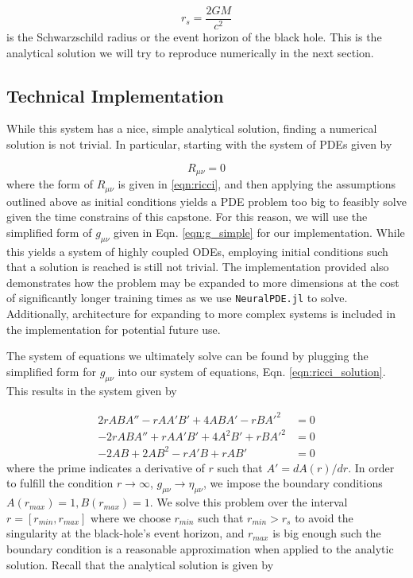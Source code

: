 \documentclass{CUP-JNL-DTM}%
\theoremstyle{definition}
\numberwithin{equation}{section}
\begin{document}
\begin{equation}
    r_s = \frac{2GM}{c^2}
\end{equation}
is the Schwarzschild radius or the event horizon of the black hole. This is the analytical solution we will try to reproduce numerically in the next section.

\subsection{Technical Implementation}

While this system has a nice, simple analytical solution, finding a numerical solution is not trivial. In particular, starting with the system of PDEs given by

\begin{equation}
    R_{\mu\nu} = 0
    \label{eqn:ricci_solution}
\end{equation}
where the form of $R_{\mu\nu}$ is given in \ref{eqn:ricci}, and then applying the assumptions outlined above as initial conditions yields a PDE problem too big to feasibly solve given the time constrains of this capstone. For this reason, we will use the simplified form of $g_{\mu\nu}$ given in Eqn. \ref{eqn:g_simple} for our implementation. While this yields a system of highly coupled ODEs, employing initial conditions such that a solution is reached is still not trivial. The implementation provided also demonstrates how the problem may be expanded to more dimensions at the cost of significantly longer training times as we use \texttt{NeuralPDE.jl} to solve. Additionally, architecture for expanding to more complex systems is included in the implementation for potential future use. 

The system of equations we ultimately solve can be found by plugging the simplified form for $g_{\mu\nu}$ into our system of equations, Eqn. \ref{eqn:ricci_solution}. This results in the system given by 

\begin{equation}
\begin{split}
    2rABA'' - rAA'B' + 4ABA' - rBA'^2 & = 0 \\
    -2rABA'' + rAA'B' + 4A^2B' + rBA'^2 & = 0 \\ 
    -2AB + 2AB^2 - rA'B + rAB' & = 0
    \label{eqn:einstein_ODEs}
\end{split}
\end{equation}
where the prime indicates a derivative of $r$ such that $A' = dA(r)/dr$. In order to fulfill the condition $r \rightarrow \infty$, $g_{\mu\nu} \rightarrow \eta_{\mu\nu}$, we impose the boundary conditions $A(r_{max}) = 1, B(r_{max}) = 1$. We solve this problem over the interval $r = [r_{min}, r_{max}]$ where we choose $r_{min}$ such that $r_{min} > r_s$ to avoid the singularity at the black-hole's event horizon, and $r_{max}$ is big enough such the boundary condition is a reasonable approximation when applied to the analytic solution. Recall that the analytical solution is given by 
\end{document}
